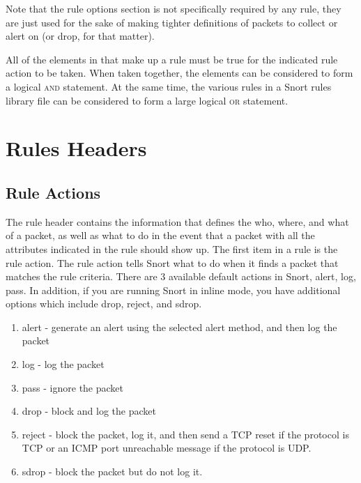 \documentclass[english]{report}
\newenvironment{note}{
\samepage
    \vspace{10pt}{\textsf{
        {\hspace{7pt}\Huge{$\triangle$\hspace{-12.5pt}{\Large{$^!$}}}}\hspace{5pt}
        {\Large{NOTE}}
    }
    }
   \begin{center}
    \par\vspace{-17pt}

    \begin{lrbox}{\savepar}
    \begin{minipage}[r]{6in}
}
{
    \end{minipage}
    \end{lrbox}
    \fbox{
        \usebox{
            \savepar
	}
    }
    \par\vskip10pt
    \end{center}
}
\newenvironment{note}{
        \begin{rawhtml}
        <p><table border="1"><tr><td><b>
        Note:&nbsp;&nbsp;</b>
        \end{rawhtml}
}{
        \begin{rawhtml}
        </b></td></tr></table></p>
        \end{rawhtml}
}
\begin{document}
\begin{note}

Note that the rule options section is not specifically required by any rule,
they are just used for the sake of making tighter definitions of packets to
collect or alert on (or drop, for that matter). 

\end{note}

All of the elements in that make up a rule must be true for the indicated rule
action to be taken. When taken together, the elements can be considered to form
a logical \textsc{and} statement. At the same time, the various rules in a
Snort rules library file can be considered to form a large logical \textsc{or}
statement. 

\section{Rules Headers}

\subsection{Rule Actions}
\label{rules action section}

The rule header contains the information that defines the who, where, and what
of a packet, as well as what to do in the event that a packet with all the
attributes indicated in the rule should show up. The first item in a rule is
the rule action. The rule action tells Snort what to do when it finds a packet
that matches the rule criteria. There are 3 available default actions in Snort,
alert, log, pass. In addition, if you are running Snort
in inline mode, you have additional options which include drop, reject, and
sdrop. 

\begin{enumerate}

\item alert - generate an alert using the selected alert method, and then
log the packet 

\item log - log the packet 

\item pass - ignore the packet 

\item drop - block and log the packet

\item reject - block the packet, log it, and then send a TCP reset
if the protocol is TCP or an ICMP port unreachable message if the protocol is
UDP.

\item sdrop - block the packet but do not log it.

\end{enumerate}
\end{document}
